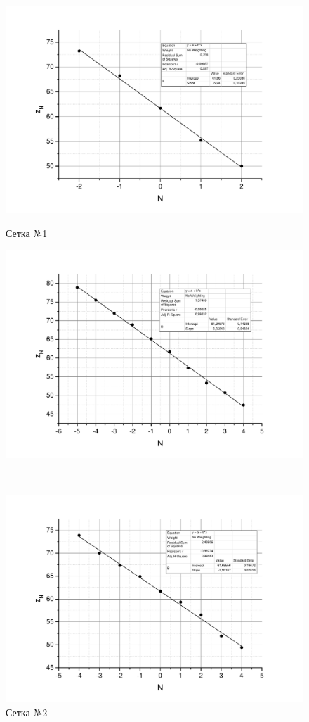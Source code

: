 \documentclass[a4paper, 12pt]{article}
\begin{document}
	\begin{figure}[h!]
		\begin{center}
			\begin{minipage}{0.49\textwidth}
				\includegraphics[width=\textwidth]{net_1}
				\caption{Сетка №1}
			\end{minipage}
			\hfill
			\begin{minipage}{0.49\textwidth}
				\includegraphics[width=\textwidth]{net_2}
				\caption{Сетка №2}
			\end{minipage}
			\\
			\begin{minipage}{0.49\textwidth}
				\includegraphics[width=\textwidth]{net_3}

\end{minipage}
\end{center}
\end{figure}
\end{document}
